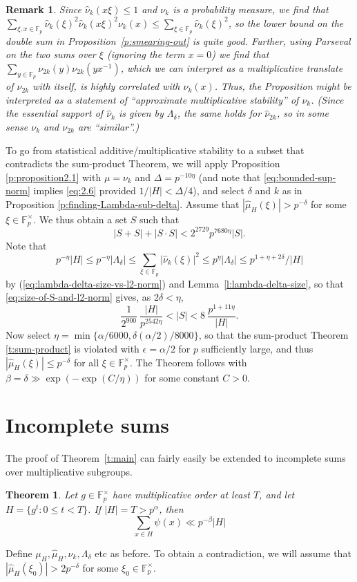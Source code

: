 \documentclass[11pt]{amsart}
\newtheorem{thm}{Theorem}[section]
\newtheorem{remark}{Remark}
\newcommand{\fp}{\mathbb{F}_p}
\newcommand{\muh}{{\mu_H}}
\newcommand{\nuhat}{{\widehat{\nu}}}
\newcommand{\muhat}{{\widehat{\mu}}}
\newcommand{\nuk}{{\nu_k}}
\begin{document}
\begin{remark}
\label{rem:statistical-multiplicativ-stability}
Since $\nuhat_k(x \xi) \leq 1$ and $\nu_k$ is a probability measure,
we find that
$\sum_{\xi,x \in \fp} \nuhat_k(\xi)^{2} \nuhat_k(x \xi)^2 \nuk(x) \leq
\sum_{\xi \in \fp} \nuhat_k(\xi)^{2}$, so the lower bound on the
double sum in Proposition~\ref{p:smearing-out} is quite good.
Further, using Parseval on the two sums over $\xi$ (ignoring the term
$x=0$) we find that  $\sum_{y \in \fp} \nu_{2k}(y)\nu_{2k}(yx^{-1})$,
which we can interpret as a multiplicative translate of $\nu_{2k}$
with itself, is highly correlated with $\nu_k(x)$.  Thus,  the Proposition
might be interpreted as a statement of ``approximate multiplicative
stability'' of $\nu_k$.  (Since the essential support of $\nuhat_k$ is
given by $\Lambda_\delta$, the same holds for $\nuhat_{2k}$, so in some
sense  $\nu_k$ and $\nu_{2k}$ are ``similar''.)
\end{remark}



To go from statistical additive/multiplicative stability to a subset
that contradicts the sum-product Theorem, we will apply Proposition
\ref{p:proposition2.1} with $\mu = \nu_k$ and $\Delta = p^{-10
\eta}$ (and note that \eqref{eq:bounded-sup-norm} implies
\eqref{eq:2.6} provided $1/|H|<\Delta/4$), and select $\delta$ and
$k$ as in Proposition \ref{p:finding-Lambda-sub-delta}. Assume that
$|\muhat_H(\xi)|>p^{-\delta}$ for some $\xi \in \fp^\times$. We thus
obtain a set $S$ such that
$$
|S+S| + |S \cdot S| <   2^{2729} p^{7680\eta} |S| .
$$
Note that
$$ p^{-\eta} |H| \leq p^{-\eta} |\Lambda_\delta|
\leq \sum_{\xi \in \fp} |\nuhat_k(\xi)|^2 \leq p^{\eta}
|\Lambda_\delta| \leq p^{1+\eta+ 2 \delta }/|H|
$$
by (\ref{eq:lambda-delta-size-vs-l2-norm}) and
Lemma~\ref{l:lambda-delta-size}, so that
\eqref{eq:size-of-S-and-l2-norm} gives, as $2\delta<\eta$,
$$
 \frac{1}{2^{900}} \  \frac{|H|}{p^{2542\eta}}< |S| <
 8  \ \frac{p^{1+11\eta}}{|H|}.
$$
Now select $\eta = \min\{ \alpha/6000, \delta(\alpha/2)/8000\}$, so
that the sum-product Theorem \ref{t:sum-product} is violated with
$\epsilon= \alpha/2$ for $p$ sufficiently large, and thus
$|\muhat_H(\xi)|\leq p^{-\delta}$ for all $\xi \in \fp^\times$. The
Theorem follows with $\beta=\delta\gg \exp(-\exp(C/\eta))$ for some
constant $C>0$.



\section{Incomplete sums}
\label{sec:incomplete-sums}
The proof of Theorem~\ref{t:main} can fairly easily be 
extended to incomplete sums over multiplicative subgroups.
\begin{thm}
Let $g \in \fp^\times$ have multiplicative order at least $T$, and let
$H = \{ g^t : 0 \leq t < T\}$.  If $|H| = T > p^\alpha$, then
$$
\sum_{x \in H}
\psi(x) \ll 
p^{-\beta} |H|
$$
\end{thm}
%
Define $\muh, \muhat_H, \nu_k, \Lambda_\delta$ etc as before.  To
obtain a 
contradiction, we will assume that $|\muhat_H(\xi_0 )| > 2
p^{-\delta}$ for some $\xi_0 \in \fp^\times$.
\end{document}
